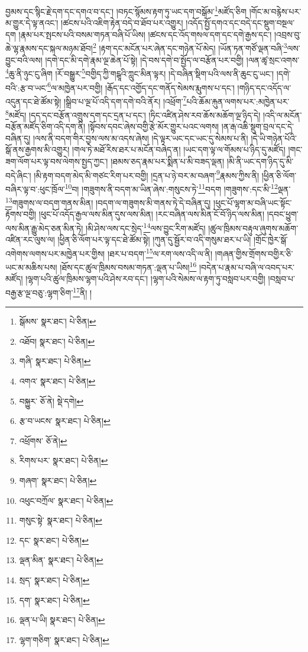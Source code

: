 བྱམས་དང་སྙིང་རྗེ་དག་དང་དགའ་བ་དང་། །བཏང་སྙོམས་རྟག་ཏུ་ཡང་དག་བསྒོམ་\footnote{སྒོམས་  སྣར་ཐང་།  པེ་ཅིན། }མཛོད་ཅིག །གོང་མ་བརྙེས་པར་མ་གྱུར་དེ་ལྟ་ནའང་། །ཚངས་པའི་འཇིག་རྟེན་བདེ་བ་ཐོབ་པར་འགྱུར། །འདོད་སྤྱོ་དགའ་དང་བདེ་དང་སྡུག་བསྔལ་དག །རྣམ་པར་སྤངས་པའི་བསམ་གཏན་བཞི་པོ་ཡིས། །ཚངས་དང་འོད་གསལ་དག་དང་དགེ་རྒྱས་དང་། །འབྲས་བུ་ཆེ་ལྷ་རྣམས་དང་སྐལ་མཉམ་ཐོབ།\footnote{འཐོབ།  སྣར་ཐང་།  པེ་ཅིན། } །རྟག་དང་མངོན་པར་ཞེན་དང་གཉེན་པོ་མེད། །ཡོན་ཏན་གཙོ་ལྡན་བཞི་\footnote{གཞི་  སྣར་ཐང་།  པེ་ཅིན། }ལས་བྱུང་བའི་ལས། །དགེ་དང་མི་དགེ་རྣམ་ལྔ་ཆེན་པོ་སྟེ། །དེ་བས་དགེ་བ་སྤྱོད་ལ་བརྩོན་པར་བགྱི། །ལན་ཚྭ་སྲང་འགས་\footnote{འགའ་  སྣར་ཐང་།  པེ་ཅིན། }ཆུ་ནི་ཉུང་ངུ་ཞིག །རོ་བསྒྱུར་\footnote{བསྐྱུར་  ཅོ་ནེ།  སྡེ་དགེ། }བགྱིད་ཀྱི་གངྒཱའི་ཀླུང་མིན་ལྟར། །དེ་བཞིན་སྡིག་པའི་ལས་ནི་ཆུང་ངུ་ཡང་། །དགེ་བའི་:རྩ་བ་ཡང་\footnote{རྩ་བ་ཡངས་  སྣར་ཐང་།  པེ་ཅིན། }ལ་མཁྱེན་པར་བགྱི། །རྒོད་དང་འགྱོད་དང་གནོད་སེམས་རྨུགས་པ་དང་། །གཉིད་དང་འདོད་ལ་འདུན་དང་ཐེ་ཚོམ་སྟེ། །སྒྲིབ་པ་ལྔ་པོ་འདི་དག་དགེ་བའི་ནོར། །འཕྲོག་\footnote{འཕྲོགས་  ཅོ་ནེ། }པའི་ཆོམ་རྐུན་ལགས་པར་:མཁྱེན་པར་\footnote{རིགས་པར་  སྣར་ཐང་།  པེ་ཅིན། }མཛོད། །དད་དང་བརྩོན་འགྲུས་དག་དང་དྲན་པ་དང་། །ཏིང་འཛིན་ཤེས་རབ་ཆོས་མཆོག་ལྔ་ཉིད་དེ། །འདི་ལ་མངོན་བརྩོན་མཛོད་ཅིག་འདི་དག་ནི། །སྟོབས་དབང་ཞེས་བགྱི་རྩེ་མོར་གྱུར་པའང་ལགས། །ན་རྒ་འཆི་སྡུག་བྲལ་དང་དེ་བཞིན་དུ། །ལས་ནི་བདག་གིར་བྱས་ལས་མ་འདས་ཞེས། །དེ་ལྟར་ཡང་དང་ཡང་དུ་སེམས་པ་ནི། །དེ་ཡི་གཉེན་པོའི་སྒོ་ནས་རྒྱགས་མི་འགྱུར། །གལ་ཏེ་མཐོ་རིས་ཐར་པ་མངོན་བཞེད་ན། །ཡང་དག་ལྟ་ལ་གོམས་པ་ཉིད་དུ་མཛོད། །གང་ཟག་ལོག་པར་ལྟ་བས་ལེགས་སྤྱད་ཀྱང་། །ཐམས་ཅད་རྣམ་པར་སྨིན་པ་མི་བཟད་ལྡན། །མི་ནི་ཡང་དག་ཉིད་དུ་མི་བདེ་ཞིང་། །མི་རྟག་བདག་མེད་མི་གཙང་རིག་པར་བགྱི། །དྲན་པ་ཉེ་བར་མ་བཞག་\footnote{གཞག་  སྣར་ཐང་།  པེ་ཅིན། }རྣམས་ཀྱིས་ནི། །ཕྱིན་ཅི་ལོག་བཞིར་ལྟ་བ་:ཕུང་ཁྲོལ་\footnote{འཕུང་བཀྲོལ་  སྣར་ཐང་།  པེ་ཅིན། }བ། །གཟུགས་ནི་བདག་མ་ཡིན་ཞེས་:གསུངས་ཏེ་\footnote{གསུང་སྟེ་  སྣར་ཐང་།  པེ་ཅིན། }བདག །གཟུགས་:དང་མི་\footnote{དང་  སྣར་ཐང་།  པེ་ཅིན། }ལྡན་\footnote{ལྡན་མིན་  སྣར་ཐང་།  པེ་ཅིན། }གཟུགས་ལ་བདག་གནས་མིན། །བདག་ལ་གཟུགས་མི་གནས་ཏེ་དེ་བཞིན་དུ། །ཕུང་པོ་ལྷག་མ་བཞི་ཡང་སྟོང་རྟོགས་བགྱི། །ཕུང་པོ་འདོད་རྒྱལ་ལས་མིན་དུས་ལས་མིན། །རང་བཞིན་ལས་མིན་ངོ་བོ་ཉིད་ལས་མིན། །དབང་ཕྱུག་ལས་མིན་རྒྱུ་མེད་ཅན་མིན་ཏེ། །མི་ཤེས་ལས་དང་སྲེད་\footnote{སྲད་  སྣར་ཐང་།  པེ་ཅིན། }ལས་བྱུང་རིག་མཛོད། །ཚུལ་ཁྲིམས་བརྟུལ་ཞུགས་མཆོག་འཛིན་རང་ལུས་ལ། །ཕྱིན་ཅི་ལོག་པར་ལྟ་དང་ཐེ་ཚོམ་སྟེ། །ཀུན་དུ་སྦྱོར་བ་འདི་གསུམ་ཐར་པ་ཡི། །གྲོང་ཁྱེར་སྒོ་འགེགས་ལགས་པར་མཁྱེན་པར་གྱིས། །ཐར་པ་བདག་\footnote{དག་  སྣར་ཐང་།  པེ་ཅིན། }ལ་རག་ལས་འདི་ལ་ནི། །གཞན་གྱིས་གྲོགས་བགྱིར་ཅི་ཡང་མ་མཆིས་པས། །ཐོས་དང་ཚུལ་ཁྲིམས་བསམ་གཏན་:ལྡན་པ་ཡིས།\footnote{ལྡན་པ་ཡི།  སྣར་ཐང་།  པེ་ཅིན། } །བདེན་པ་རྣམ་པ་བཞི་ལ་འབད་པར་མཛོད། །ལྷག་པའི་ཚུལ་ཁྲིམས་ལྷག་པའི་ཤེས་རབ་དང་། །ལྷག་པའི་སེམས་ལ་རྟག་ཏུ་བསླབ་པར་བགྱི། །བསླབ་པ་བརྒྱ་རྩ་ལྔ་བཅུ་:ལྷག་ཅིག་\footnote{ལྷག་གཅིག་  སྣར་ཐང་།  པེ་ཅིན། }ནི། །

